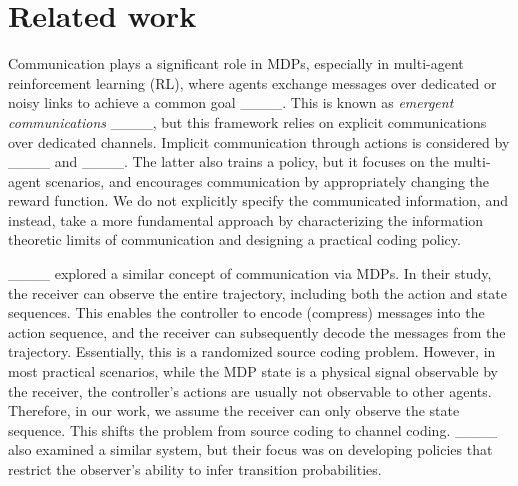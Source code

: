 \section{Related work}
Communication plays a significant role in MDPs, especially in multi-agent reinforcement learning (RL), where agents exchange messages over dedicated or noisy links  to achieve a common goal ____. 
This is known as \textit{emergent communications} ____, but this framework relies on explicit communications over dedicated channels.  Implicit communication through actions is considered by ____ and ____. The latter also trains a policy, but it focuses on the multi-agent scenarios, and encourages communication by appropriately changing the reward function. We do not explicitly specify the communicated information, and instead, take a more fundamental approach by characterizing the information theoretic limits of communication and designing a practical coding policy.

{\color{black} ____ explored a similar concept of communication via MDPs. In their study, the receiver can observe the entire trajectory, including both the action and state sequences. This enables the controller to encode (compress) messages into the action sequence, and the receiver can subsequently decode the messages from the trajectory. Essentially, this is a randomized source coding problem. However, in most practical scenarios, while the MDP state is a physical signal observable by the receiver, the controller’s actions are usually not observable to other agents. Therefore, in our work, we assume the receiver can only observe the state sequence. This shifts the problem from source coding to channel coding. ____ also examined a similar system, but their focus was on developing policies that restrict the observer’s ability to infer transition probabilities. }

